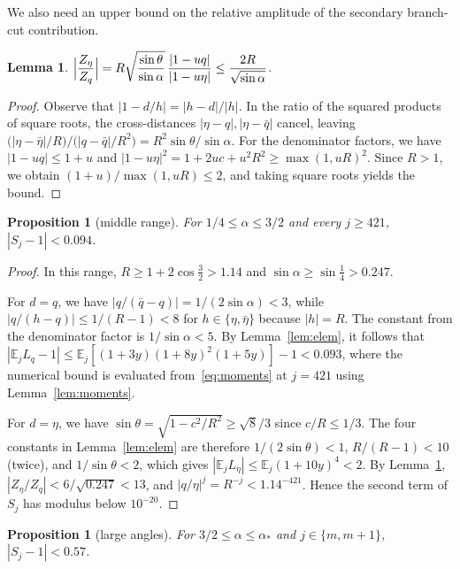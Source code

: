 \documentclass[11pt]{amsart}
\newtheorem{lemma}[theorem]{Lemma}
\newtheorem{proposition}[theorem]{Proposition}
\theoremstyle{remark}
\newcommand{\E}{\mathbb{E}}
\begin{document}
We also need an upper bound on the relative amplitude of the secondary
branch-cut contribution.

\begin{lemma}\label{lem:amp}
$\displaystyle\Bigl|\frac{Z_\eta}{Z_q}\Bigr|=R\sqrt{\frac{\sin\theta}{\sin\alpha}}\,
\frac{|1-uq|}{|1-u\eta|}\le\frac{2R}{\sqrt{\sin\alpha}}$.
\end{lemma}

\begin{proof}
Observe that $|1-d/h|=|h-d|/|h|$. In the ratio of the squared products of
square roots, the cross-distances $|\eta-q|,|\eta-\bar q|$ cancel, leaving
$\bigl(|\eta-\bar\eta|/R\bigr)/\bigl(|q-\bar q|/R^2\bigr)=R^2\sin\theta/\sin\alpha$.
For the denominator factors, we have $|1-uq|\le1+u$ and
$|1-u\eta|^2=1+2uc+u^2R^2\ge\max(1,uR)^2$. Since $R>1$, we obtain
$(1+u)/\max(1,uR)\le2$, and taking square roots yields the bound.
\end{proof}

\begin{proposition}[middle range]\label{prop:middle}
For $1/4\le\alpha\le3/2$ and every $j\ge421$, $|S_j-1|<0.094$.
\end{proposition}

\begin{proof}
In this range, $R\ge1+2\cos\frac32>1.14$ and $\sin\alpha\ge\sin\frac14>0.247$.

For $d=q$, we have $|q/(\bar q-q)|=1/(2\sin\alpha)<3$, while
$|q/(h-q)|\le1/(R-1)<8$ for $h\in\{\eta,\bar\eta\}$ because $|h|=R$. The
constant from the denominator factor is $1/\sin\alpha<5$. By
Lemma~\ref{lem:elem}, it follows that
$|\E_jL_q-1|\le\E_j[(1+3y)(1+8y)^2(1+5y)]-1<0.093$, where the numerical
bound is evaluated from~\eqref{eq:moments} at $j=421$ using
Lemma~\ref{lem:moments}.

For $d=\eta$, we have $\sin\theta=\sqrt{1-c^2/R^2}\ge\sqrt8/3$ since
$c/R\le1/3$. The four constants in Lemma~\ref{lem:elem} are therefore
$1/(2\sin\theta)<1$, $R/(R-1)<10$ (twice), and $1/\sin\theta<2$, which gives
$|\E_jL_\eta|\le\E_j(1+10y)^4<2$. By Lemma~\ref{lem:amp},
$|Z_\eta/Z_q|<6/\sqrt{0.247}<13$, and $|q/\eta|^j=R^{-j}<1.14^{-421}$.
Hence the second term of $S_j$ has modulus below $10^{-20}$.
\end{proof}

\begin{proposition}[large angles]\label{prop:large}
For $3/2\le\alpha\le\alpha_*$ and $j\in\{m,m+1\}$, $|S_j-1|<0.57$.
\end{proposition}
\end{document}
